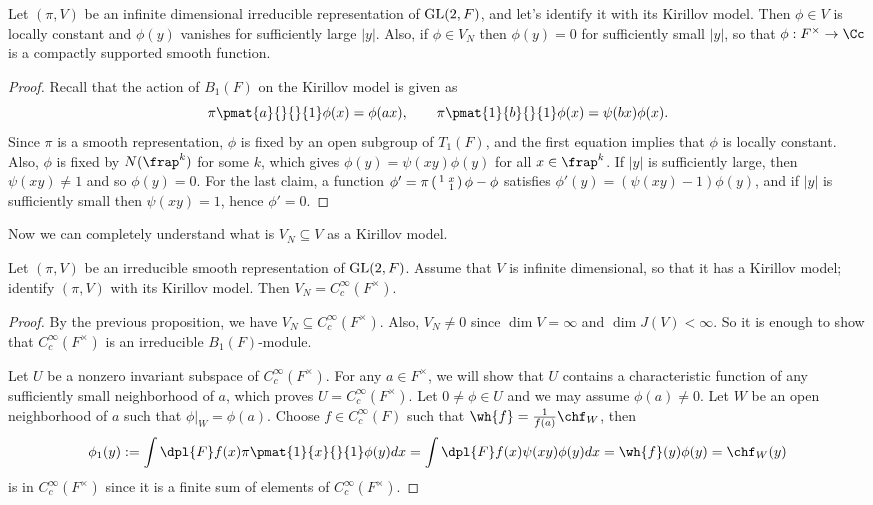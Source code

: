 \begin{proposition}
Let $(\pi, V)$ be an infinite dimensional  irreducible representation of $\mathrm{GL}(2, F)$, and let's identify it with its Kirillov model. 
Then $\phi\in V$ is locally constant and $\phi(y)$ vanishes for sufficiently large $|y|$. 
Also, if $\phi\in V_N$ then $\phi(y) = 0$ for sufficiently small $|y|$, so that $\phi:F^{\times} \to \Cc$ is a compactly supported smooth function. 
\end{proposition}
\begin{proof}
Recall that the action of $B_{1}(F)$ on the Kirillov model is given as
$$
\pi\pmat{a}{}{}{1} \phi(x) = \phi(ax), \qquad \pi\pmat{1}{b}{}{1}\phi(x) = \psi(bx)\phi(x). 
$$
Since $\pi$ is a smooth representation, $\phi$ is fixed by an open subgroup of $T_1(F)$, and the first equation implies that $\phi$ is locally constant. 
Also, $\phi$ is fixed by $N(\frap^k)$ for some $k$, which gives $\phi(y) = \psi(xy) \phi(y)$ for all $x\in \frap^k$. If $|y|$ is sufficiently large, then $\psi(xy) \neq 1$ and so $\phi(y) = 0$. 
For the last claim, a function $\phi' = \pi\left(\begin{smallmatrix} 1 & x \\  & 1 \end{smallmatrix}\right)\phi - \phi$ satisfies $\phi'(y) = (\psi(xy) -1 )\phi(y)$, and if $|y|$ is sufficiently small then $\psi(xy) = 1$, hence $\phi' = 0$. 
\end{proof}
Now we can completely understand what is $V_N \subseteq V$ as a Kirillov model. 
\begin{theorem}
\label{kicpt}
Let $(\pi, V)$ be an irreducible smooth representation of $\mathrm{GL}(2, F)$. 
Assume that $V$ is infinite dimensional, so that it has a Kirillov model; identify $(\pi, V)$ with its Kirillov model. 
Then $V_N = C_{c}^{\infty}(F^{\times})$. 
\end{theorem}
\begin{proof}
By the previous proposition, we have $V_N\subseteq C_{c}^{\infty}(F^{\times})$. 
Also, $V_N\neq 0$ since $\dim V = \infty$ and $\dim J(V) <\infty$. So it is enough to show that $C_{c}^{\infty}(F^{\times})$ is an irreducible $B_1(F)$-module. 

Let $U$ be a nonzero invariant subspace of $C_c^{\infty}(F^{\times})$. For any $a\in F^{\times}$, we will show that $U$ contains a characteristic function of any sufficiently small neighborhood of $a$, which proves $U = C_{c}^{\infty}(F^{\times})$. 
Let $0\neq \phi\in U$ and we may assume $\phi(a)\neq 0$. Let $W$ be an open neighborhood of $a$ such that $\phi|_{W} = \phi(a)$. 
Choose $f\in C_{c}^{\infty}(F)$ such that $\wh{f} = \frac{1}{f(a)} \chf_{W}$, then 
$$
\phi_1(y) := \int\dpl{F} f(x) \pi\pmat{1}{x}{}{1}\phi(y) dx = \int\dpl{F}f(x)\psi(xy)\phi(y)dx = \wh{f}(y)\phi(y) =  \chf_{W}(y)
$$
is in $C_{c}^{\infty}(F^{\times})$ since it is a finite sum of elements of $C_{c}^{\infty}(F^{\times})$. 
\end{proof}

